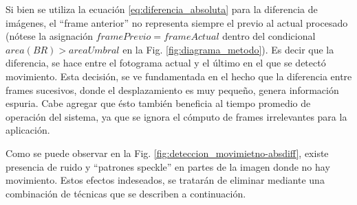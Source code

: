 Si bien se utiliza la ecuación \eqref{eq:diferencia_absoluta} para la diferencia de imágenes, el ``frame anterior'' no representa siempre el previo al actual procesado (nótese la asignación $framePrevio=frameActual$ dentro del condicional $area(BR)>areaUmbral$ en la Fig. \ref{fig:diagrama_metodo}). Es decir que la diferencia, se hace entre el fotograma actual y el último en el que se detectó movimiento. %
Esta decisión, se ve fundamentada en el hecho que la diferencia entre frames sucesivos, donde el desplazamiento es muy pequeño, genera información espuria. Cabe agregar que ésto también beneficia al tiempo promedio de operación del sistema, ya que se ignora el cómputo de frames irrelevantes para la aplicación.


Como se puede observar en la Fig. \ref{fig:deteccion_movimietno-absdiff}, existe presencia de ruido y ``patrones speckle'' en partes de la imagen donde no hay movimiento. Estos efectos indeseados, se tratarán de eliminar mediante una combinación de técnicas que se describen a continuación.
